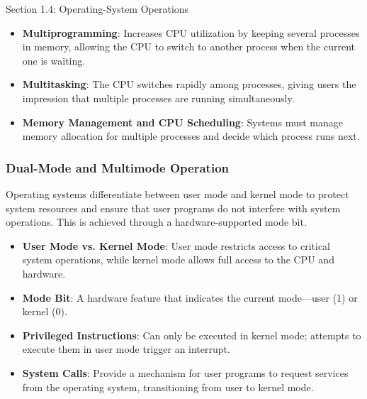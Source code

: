 \begin{notes}{Section 1.4: Operating-System Operations}
    \begin{highlight}
    
    \begin{itemize}
        \item \textbf{Multiprogramming}: Increases CPU utilization by keeping several processes in memory, allowing the CPU to switch to another process when the current one is waiting.
        \item \textbf{Multitasking}: The CPU switches rapidly among processes, giving users the impression that multiple processes are running simultaneously.
        \item \textbf{Memory Management and CPU Scheduling}: Systems must manage memory allocation for multiple processes and decide which process runs next.
    \end{itemize}
    
    \end{highlight}
    
    \subsubsection*{Dual-Mode and Multimode Operation}
    
    Operating systems differentiate between user mode and kernel mode to protect system resources and ensure that user programs do not interfere with system operations. This is achieved through a hardware-supported mode bit.
    
    \begin{highlight}
    
    \begin{itemize}
        \item \textbf{User Mode vs. Kernel Mode}: User mode restricts access to critical system operations, while kernel mode allows full access to the CPU and hardware.
        \item \textbf{Mode Bit}: A hardware feature that indicates the current mode—user (1) or kernel (0).
        \item \textbf{Privileged Instructions}: Can only be executed in kernel mode; attempts to execute them in user mode trigger an interrupt.
        \item \textbf{System Calls}: Provide a mechanism for user programs to request services from the operating system, transitioning from user to kernel mode.
    \end{itemize}
    

\end{highlight}
\end{notes}
